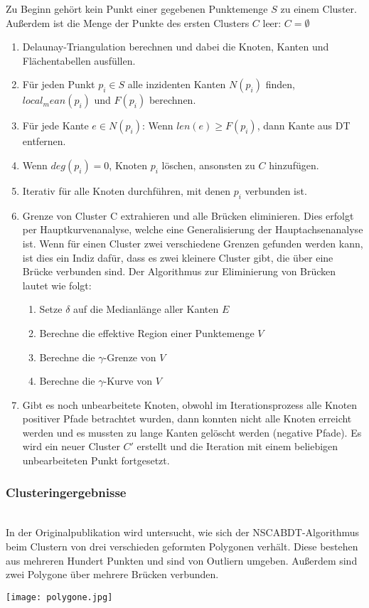 \documentclass[11pt,ceqn]{book}
\begin{document}
Zu Beginn gehört kein Punkt einer gegebenen Punktemenge $S$ zu einem Cluster. Außerdem ist die Menge der Punkte des ersten Clusters $C$ leer: $C=\emptyset$
\begin{enumerate}
\item Delaunay-Triangulation berechnen und dabei die Knoten, Kanten und Flächentabellen ausfüllen.
\item Für jeden Punkt $p_i \in S$ alle inzidenten Kanten $N(p_i)$ finden, $local_mean(p_i)$ und $F(p_i)$ berechnen.
\item Für jede Kante $e \in N(p_i)$: Wenn $len(e) \geqslant F(p_i)$, dann Kante aus DT entfernen.
\item Wenn $deg(p_i)=0$, Knoten $p_i$ löschen, ansonsten zu $C$ hinzufügen.
\item Iterativ für alle Knoten durchführen, mit denen $p_i$ verbunden ist.
\item Grenze von Cluster C extrahieren und alle Brücken eliminieren. Dies erfolgt per Hauptkurvenanalyse, welche eine Generalisierung der Hauptachsenanalyse ist. Wenn für einen Cluster zwei verschiedene Grenzen gefunden werden kann, ist dies ein Indiz dafür, dass es zwei kleinere Cluster gibt, die über eine Brücke verbunden sind. Der Algorithmus zur Eliminierung von Brücken lautet wie folgt:
\begin{enumerate}
\item Setze $\delta$ auf die Medianlänge aller Kanten $E$
\item Berechne die effektive Region einer Punktemenge $V$
\item Berechne die $\gamma$-Grenze von $V$
\item Berechne die $\gamma$-Kurve von $V$
\end{enumerate}
\item Gibt es noch unbearbeitete Knoten, obwohl im Iterationsprozess alle Knoten positiver Pfade betrachtet wurden, dann konnten nicht alle Knoten erreicht werden und es mussten zu lange Kanten gelöscht werden (negative Pfade). Es wird ein neuer Cluster $C'$ erstellt und die Iteration mit einem beliebigen unbearbeiteten Punkt fortgesetzt.
\end{enumerate}



\begin{minipage}{0.45\textwidth}\raggedright
\subsubsection{Clusteringergebnisse} ~\\
In der Originalpublikation wird untersucht, wie sich der NSCABDT-Algorithmus beim Clustern von drei verschieden geformten Polygonen verhält. Diese bestehen aus mehreren Hundert Punkten und sind von Outliern umgeben. Außerdem sind zwei Polygone über mehrere Brücken verbunden.
\end{minipage}
\hfill
\begin{minipage}{0.5\textwidth}
\texttt{[image: polygone.jpg]}
\end{minipage}
\end{document}
